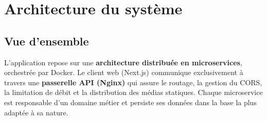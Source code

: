 \section{Architecture du système}

\subsection{Vue d'ensemble}

L'application repose sur une \textbf{architecture distribuée en microservices},
orchestrée par Docker. Le client web (Next.js) communique exclusivement à travers
une \textbf{passerelle API (Nginx)} qui assure le routage, la gestion du CORS, la
limitation de débit et la distribution des médias statiques. Chaque microservice
est responsable d'un domaine métier et persiste ses données dans la base la plus
adaptée à sa nature.

